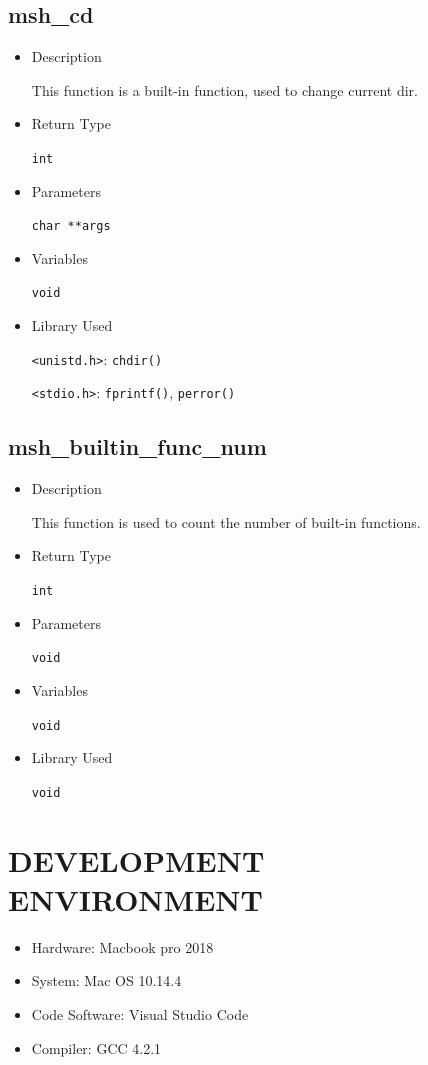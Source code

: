 \documentclass{article}
\begin{document}
\subsection{msh\_cd}
\begin{itemize}
\item Description

This function is a built-in function, used to change current dir.

\item Return Type

\verb|int|

\item Parameters

\verb|char **args|

\item Variables

\verb|void|

\item Library Used

\verb|<unistd.h>|: \verb|chdir()|

\verb|<stdio.h>|: \verb|fprintf()|, \verb|perror()|

\end{itemize}

\subsection{msh\_builtin\_func\_num}
\begin{itemize}
\item Description

This function is used to count the number of built-in functions.

\item Return Type

\verb|int|

\item Parameters

\verb|void|

\item Variables

\verb|void|

\item Library Used

\verb|void|
\end{itemize}

\newpage
\section{DEVELOPMENT ENVIRONMENT}

\begin{itemize}
\item Hardware: Macbook pro 2018
\item System: Mac OS 10.14.4
\item Code Software: Visual Studio Code
\item Compiler: GCC 4.2.1
\end{itemize}
\end{document}
